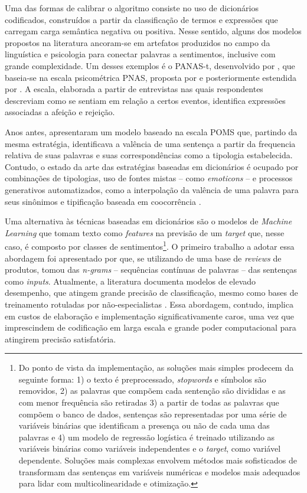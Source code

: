 \documentclass[
12pt,				%
openright,			%
twoside,			%
a4paper,			%
english,			%
french,				%
spanish,			%
brazil				%
]{abntex2}
\begin{document}
Uma das formas de calibrar o algoritmo consiste no uso de dicionários codificados, construídos a partir da classificação de termos e expressões que carregam carga semântica negativa ou positiva. Nesse sentido, alguns dos modelos propostos na literatura ancoram-se em artefatos produzidos no campo da linguística e psicologia para conectar palavras a sentimentos, inclusive com grande complexidade. Um desses exemplos é o PANAS-t, desenvolvido por  , que baseia-se na escala psicométrica PNAS, proposta por  e posteriormente estendida por . A escala, elaborada a partir de entrevistas nas quais respondentes descreviam como se sentiam em relação a certos eventos, identifica expressões associadas a afeição e rejeição. 

Anos antes,  apresentaram um modelo baseado na escala POMS \cite{mcnair2003profile} que, partindo da mesma estratégia, identificava a valência de uma sentença a partir da frequencia relativa de suas palavras e suas correspondências como a tipologia estabelecida. Contudo, o estado da arte das estratégias baseadas em dicionários é ocupado por combinações de tipologias, uso de fontes mistas -- como \emph{emoticons} --  e processos generativos automatizados, como a interpolação da valência de uma palavra para seus sinônimos e tipificação baseada em coocorrência \cite{hogenboom2013exploiting, hutto2014vader, thelwall2014sentistrength, canuto2016exploiting}.

Uma alternativa às técnicas baseadas em dicionários são o modelos de \emph{Machine Learning} que tomam texto como \emph{features} na previsão de um \emph{target} que, nesse caso, é composto por classes de sentimentos\footnote{Do ponto de vista da implementação, as soluções mais simples prodecem da seguinte forma: 1) o texto é preprocessado, \emph{stopwords} e símbolos são removidos, 2) as palavras que compõem cada sentenção são divididas e as com menor frequência são retiradas 3) a partir de todas as palavras que compõem o banco de dados, sentenças são representadas por uma série de variáveis binárias que identificam a presença ou não de cada uma das palavras e 4) um modelo de regressão logística é treinado utilizando as variáveis binárias como variáveis independentes e o \emph{target}, como variável dependente. Soluções mais complexas envolvem métodos mais sofisticados de transformam das sentenças em variáveis numéricas e modelos mais adequados para lidar com multicolinearidade e otimização.}. O primeiro trabalho a adotar essa abordagem foi apresentado por  que, se utilizando de uma base de \emph{reviews} de produtos, tomou das \emph{n-grams} -- sequências contínuas de palavras -- das sentenças como \emph{inputs}. Atualmente, a literatura documenta modelos de elevado desempenho, que atingem grande precisão de classificação, mesmo como bases de treinamento rotuladas por não-especialistas \cite{howard2018universal, sun2019fine, yang2019xlnet}. Essa abordagem, contudo, implica em custos de elaboração e implementação significativamente caros, uma vez que imprescindem de codificação em larga escala e grande poder computacional para atingirem precisão satisfatória.
\end{document}
